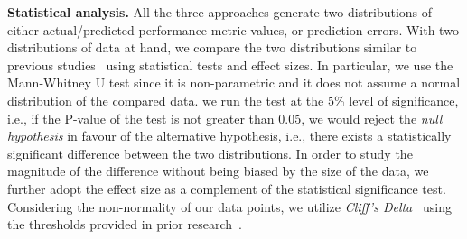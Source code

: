 \noindent\textbf{Statistical analysis.}
All the three approaches generate two distributions of either actual/predicted performance metric values, or prediction errors. With two distributions of data at hand, we compare the two distributions similar to previous studies~\citep{Chen:2016:CHD:2950290.2950303} using statistical tests and effect sizes. In particular, we use the Mann-Whitney U test since it is non-parametric and it does not assume a normal distribution of the compared data. we run the test at the 5\% level of significance, i.e., if the P-value of the test is not greater than 0.05, we would reject the \emph{null hypothesis} in favour of the alternative hypothesis, i.e., there exists a statistically significant difference between the two distributions. In order to study the magnitude of the difference without being biased by the size of the data, we further adopt the effect size  as a complement
of the statistical significance test. Considering the non-normality of our data points, we
utilize \emph{Cliff's Delta}~\citep{cliff1996ordinal} using the
thresholds provided in prior research~\citep{romano2006appropriate}.


